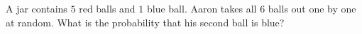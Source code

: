 A jar contains $5$ red balls and $1$ blue ball. Aaron takes all $6$ balls out one by one at random. What is the probability that his second ball is blue?
